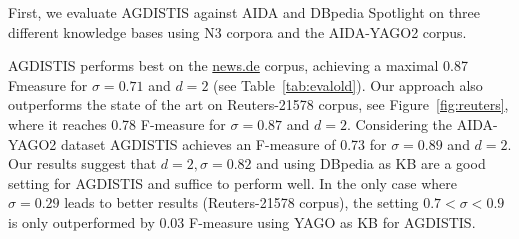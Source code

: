 First, we evaluate AGDISTIS against AIDA and DBpedia Spotlight on three different knowledge bases using N3 corpora and the AIDA-YAGO2 corpus. 

AGDISTIS performs best on the \url{news.de} corpus, achieving a maximal 0.87 F\-measure for $\sigma = 0.71$ and $d = 2$ (see Table~\ref{tab:evalold}).
Our approach also outperforms the state of the art on Reuters-21578 corpus, see Figure~\ref{fig:reuters}, where it reaches 0.78 \mbox{F-measure} for $\sigma = 0.87$ and $d = 2$.
Considering the AIDA-YAGO2 dataset AGDISTIS achieves an \mbox{F-measure} of 0.73 for $\sigma = 0.89$ and $d = 2$.
Our results suggest that $d=2, \sigma=0.82$ and using DBpedia as \ac{KB} are a good setting for AGDISTIS and suffice to perform well. %
In the only case where $\sigma=0.29$ leads to better results (Reuters-21578 corpus), the setting $0.7<\sigma<0.9$ is only outperformed by 0.03 F-measure using YAGO as \ac{KB} for AGDISTIS.


